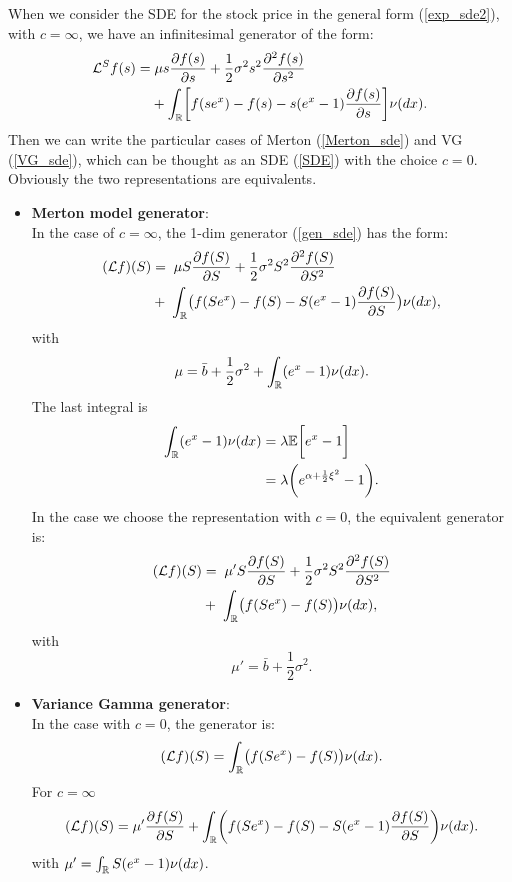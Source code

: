 When we consider the SDE for the stock price in the general form (\ref{exp_sde2}), with $c=\infty$, we have an infinitesimal generator of the form:
\begin{align}\label{inf_gen_exp_levy}
 \mathcal{L}^S f(s) =& \; \mu s \frac{\partial f(s)}{\partial s}
+ \frac{1}{2} \sigma^2 s^2 \frac{\partial^2  f(s)}{\partial s^2}  \\ \nonumber
&+ \int_{\mathbb{R}} \biggl[ f(se^x) - f(s) - s(e^x-1)\frac{\partial f(s)}{\partial s} \biggr] \nu(dx).
\end{align}
Then we can write the particular
cases of Merton (\ref{Merton_sde}) and VG (\ref{VG_sde}), which can be thought as an SDE (\ref{SDE}) with the choice $c=0$. \\
Obviously the two representations are equivalents.
\begin{itemize}
 \item \textbf{Merton model generator}:\\
 In the case of $c=\infty$, the 1-dim generator (\ref{gen_sde}) has the form:  
 \begin{align}\label{Merton_gen}
  (\mathcal{L} f)(S)  &= \;  \mu S \frac{\partial f(S)}{\partial S} + \frac{1}{2} \sigma^2 S^2 \frac{\partial^2 f(S)}{\partial S^2} \\ \nonumber
  &+ \; \int_{\mathbb{R}} \bigl( f(Se^x) - f(S) - S(e^x-1)\frac{\partial f(S)}{\partial S} \bigr) \nu(dx), 
 \end{align}
with $$ \mu = \bar b + \frac{1}{2}\sigma^2 + \int_{\mathbb{R}} ( e^{x} - 1 ) \nu(dx). $$
The last integral is 
\begin{align*}
 \int_{\mathbb{R}} ( e^{x} - 1 ) \nu(dx) &= \lambda \mathbb{E} \biggl[  e^{x} - 1  \biggr] \\
                                 &= \lambda \biggl( e^{\alpha + \frac{1}{2} \xi^2} -1 \biggr).
\end{align*}
In the case we choose the representation with $c=0$, the equivalent generator is:
 \begin{align}\label{Merton_gen}
  (\mathcal{L} f)(S)  &= \;  \mu'S \frac{\partial f(S)}{\partial S} + \frac{1}{2} \sigma^2 S^2 \frac{\partial^2 f(S)}{\partial S^2} \\ \nonumber
  &+ \; \int_{\mathbb{R}} \bigl( f(Se^x) - f(S) \bigr) \nu(dx), 
 \end{align}
with $$ \mu' = \bar b + \frac{1}{2}\sigma^2. $$
 \item \textbf{Variance Gamma generator}:\\
 In the case with $c = 0$, the generator is:
 \begin{equation}\label{VG_gen}
  (\mathcal{L} f)(S) = \int_{\mathbb{R}} \bigl( f(Se^x) - f(S) \bigr) \nu(dx).
 \end{equation}
 \newline
 For $c = \infty$ 
 \begin{equation*}
  (\mathcal{L} f)(S) = \mu' \frac{\partial f(S)}{\partial S} 
  + \int_{\mathbb{R}} \biggl( f(Se^x) - f(S) - S(e^x-1)\frac{\partial f(S)}{\partial S} \biggr) \nu(dx).
 \end{equation*}
 with $\mu' = \int_{\mathbb{R}} S(e^x-1)\nu(dx)$.
\end{itemize}
